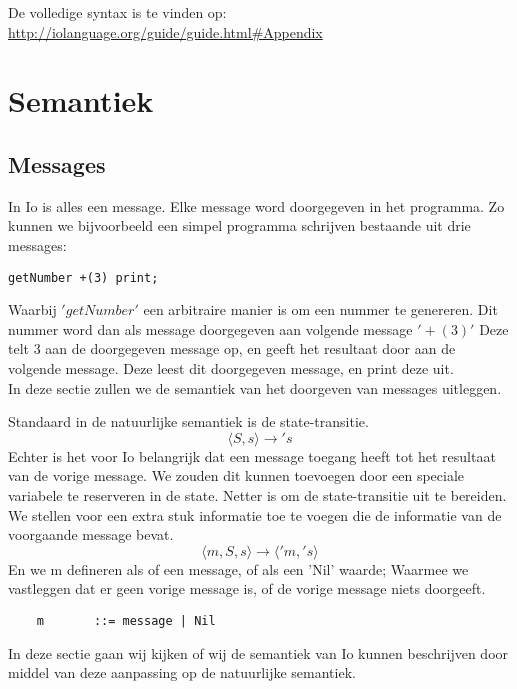 \documentclass[12pt]{article}
\begin{document}
De volledige syntax is te vinden op: \url{http://iolanguage.org/guide/guide.html#Appendix}

\section{Semantiek}

\subsection{Messages}
In Io is alles een message. Elke message word doorgegeven in het programma. Zo kunnen we bijvoorbeeld een simpel programma schrijven bestaande uit drie messages:
\begin{lstlisting}[frame=single]
getNumber +(3) print;
\end{lstlisting}
Waarbij \('getNumber'\) een arbitraire manier is om een nummer te genereren. Dit nummer word dan als message doorgegeven aan volgende message \('+(3)'\) Deze telt \(3\) aan de doorgegeven message op, en geeft het resultaat door aan de volgende message. Deze leest dit doorgegeven message, en print deze uit.\\
In deze sectie zullen we de semantiek van het doorgeven van messages uitleggen.\par
Standaard in de natuurlijke semantiek is de state-transitie.
\[\langle S,s \rangle \rightarrow \prime s\] Echter is het voor Io belangrijk dat een message toegang heeft tot het resultaat van de vorige message. We zouden dit kunnen toevoegen door een speciale variabele te reserveren in de state. Netter is om de state-transitie uit te bereiden. We stellen voor een extra stuk informatie toe te voegen die de informatie van de voorgaande message bevat.
\[\langle m,S,s \rangle \rightarrow \langle \prime m,\prime s \rangle\]
En we m defineren als of een message, of als een 'Nil' waarde; Waarmee we vastleggen dat er geen vorige message is, of de vorige message niets doorgeeft.
\begin{lstlisting}
	m		::= message | Nil
\end{lstlisting}
In deze sectie gaan wij kijken of wij de semantiek van Io kunnen beschrijven door middel van deze aanpassing op de natuurlijke semantiek.
\end{document}
